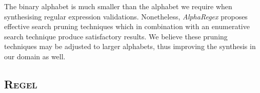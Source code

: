 \medskip

The binary alphabet is much smaller than the alphabet we require when synthesising regular expression validations. Nonetheless, \textit{AlphaRegex} proposes effective search pruning techniques which in combination with an enumerative search technique produce satisfactory results.
We believe these pruning techniques may be adjusted to larger alphabets, thus improving the synthesis in our domain as well.

\subsection{\textsc{Regel}}